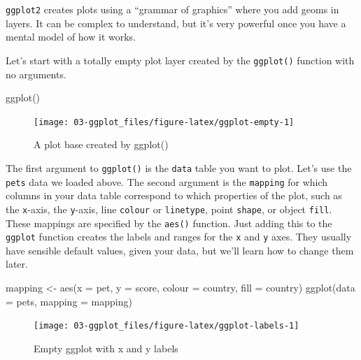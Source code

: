 \documentclass[
  oneside]{book}
\newenvironment{Shaded}{\begin{snugshade}}{\end{snugshade}}
\newcommand{\AttributeTok}[1]{\textcolor[rgb]{0.77,0.63,0.00}{#1}}
\newcommand{\FunctionTok}[1]{\textcolor[rgb]{0.00,0.00,0.00}{#1}}
\newcommand{\NormalTok}[1]{#1}
\newcommand{\OtherTok}[1]{\textcolor[rgb]{0.56,0.35,0.01}{#1}}
\begin{document}
\texttt{ggplot2} creates plots using a ``grammar of graphics'' where you add geoms in layers. It can be complex to understand, but it's very powerful once you have a mental model of how it works.

Let's start with a totally empty plot layer created by the \texttt{ggplot()} function with no arguments.

\begin{Shaded}
\begin{Highlighting}[]
\FunctionTok{ggplot}\NormalTok{()}
\end{Highlighting}
\end{Shaded}

\begin{figure}

{\centering \texttt{[image: 03-ggplot\_files/figure-latex/ggplot-empty-1]} 

}

\caption{A plot base created by ggplot()}\label{fig:ggplot-empty}
\end{figure}

The first argument to \texttt{ggplot()} is the \texttt{data} table you want to plot. Let's use the \texttt{pets} data we loaded above. The second argument is the \texttt{mapping} for which columns in your data table correspond to which properties of the plot, such as the \texttt{x}-axis, the \texttt{y}-axis, line \texttt{colour} or \texttt{linetype}, point \texttt{shape}, or object \texttt{fill}. These mappings are specified by the \texttt{aes()} function. Just adding this to the \texttt{ggplot} function creates the labels and ranges for the \texttt{x} and \texttt{y} axes. They usually have sensible default values, given your data, but we'll learn how to change them later.

\begin{Shaded}
\begin{Highlighting}[]
\NormalTok{mapping }\OtherTok{\textless{}{-}} \FunctionTok{aes}\NormalTok{(}\AttributeTok{x =}\NormalTok{ pet, }
               \AttributeTok{y =}\NormalTok{ score, }
               \AttributeTok{colour =}\NormalTok{ country, }
               \AttributeTok{fill =}\NormalTok{ country)}
\FunctionTok{ggplot}\NormalTok{(}\AttributeTok{data =}\NormalTok{ pets, }\AttributeTok{mapping =}\NormalTok{ mapping)}
\end{Highlighting}
\end{Shaded}

\begin{figure}

{\centering \texttt{[image: 03-ggplot\_files/figure-latex/ggplot-labels-1]} 

}

\caption{Empty ggplot with x and y labels}\label{fig:ggplot-labels}
\end{figure}
\end{document}
